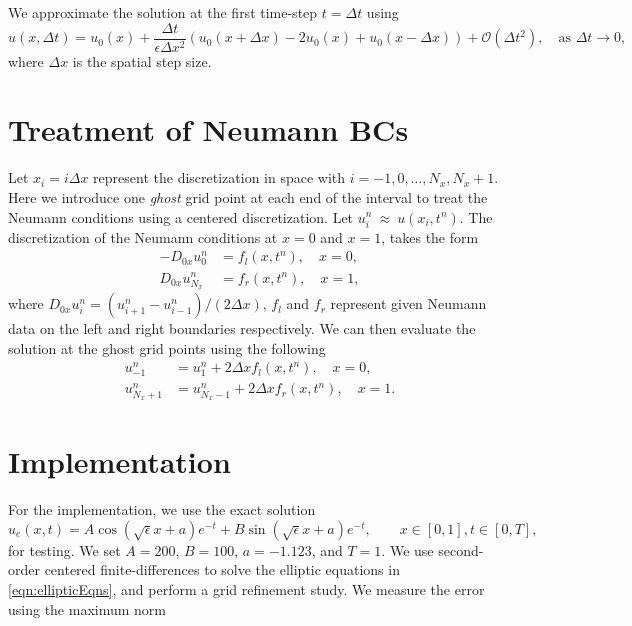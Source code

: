 \documentclass[11pt]{article}
\numberwithin{equation}{section}
\newcommand{\dt}{\Delta t}
\newcommand{\dx}{\Delta x}
\newcommand{\dzx}{D_{0x}}
\newcommand{\Nx}{N_x}
\begin{document}
We approximate the solution at the first time-step $t = \dt$ using 
\begin{equation}
u(x,\dt) = u_0(x) + \frac{\dt}{\epsilon\dx^2}(u_0(x + \dx) - 2u_0(x) + u_0(x - \dx)) + \mathcal{O}(\dt^2), \quad \text{as } \dt\rightarrow 0,
\end{equation}
where $\dx$ is the spatial step size. 

\section{Treatment of Neumann BCs}
Let $x_i = i\dx$ represent the discretization in space with $i = -1,0, \dots, N_x, N_x + 1$. Here we introduce one \emph{ghost} grid point at each end of the interval to treat the Neumann conditions using a centered discretization. Let $u_i^n~\approx~u(x_i,t^n)$. The discretization of the Neumann conditions at $x = 0$ and $x = 1$, takes the form 
\begin{align*}
	-\dzx u_{0}^n &= f_{l}(x, t^n), \quad x = 0,\\
		\dzx u_{\Nx}^n &= f_{r}(x, t^n),\quad x= 1, 
\end{align*}
where $\dzx u_i^n = (u_{i+1}^n - u_{i-1}^n)/(2\dx)$, $f_l$ and $f_r$ represent given Neumann data on the left and right boundaries respectively. We can then evaluate the solution at the ghost grid points using the following 
\begin{align*}
	u_{-1}^n &= u_1^n + 2\dx f_l(x,t^n), \quad x = 0, \\
	u_{\Nx + 1}^n &= u_{\Nx-1}^n + 2\dx f_r(x,t^n), \quad x = 1. 
\end{align*}
\section{Implementation}	
For the implementation, we use the exact solution  
\begin{equation}
u_{e}(x,t) = A \cos(\sqrt{\epsilon}x + a)e^{-t} + B \sin(\sqrt{\epsilon}x+a)e^{-t}, \qquad x\in[0,1], t\in[0,T], 
\end{equation}
for testing. 
We set $A = 200$, $B = 100$, $a = -1.123$, and $T = 1$. We use second-order centered finite-differences to solve the elliptic equations in \eqref{eqn:ellipticEqns}, and perform a grid refinement study. We measure the error using the maximum norm  
\end{document}
